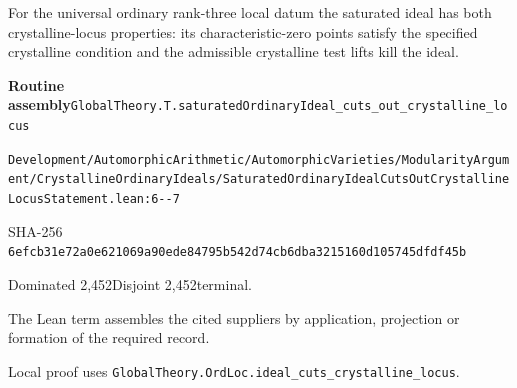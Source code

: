 \begin{formalstatement}[D097]\label{decomp:D097}
For the universal ordinary rank-three local datum the saturated ideal has both crystalline-locus properties: its characteristic-zero points satisfy the specified crystalline condition and the admissible crystalline test lifts kill the ideal.
\end{formalstatement}
{\small\raggedright\noindent\textsf{\bfseries Routine assembly}\quad \nolinkurl{GlobalTheory.T.saturatedOrdinaryIdeal_cuts_out_crystalline_locus}\par\noindent \nolinkurl{Development/AutomorphicArithmetic/AutomorphicVarieties/ModularityArgument/CrystallineOrdinaryIdeals/SaturatedOrdinaryIdealCutsOutCrystallineLocusStatement.lean:6--7}\par\noindent SHA-256 \nolinkurl{6efcb31e72a0e621069a90ede84795b542d74cb6dba3215160d105745dfdf45b}\par\noindent Dominated 2,452\quad Disjoint 2,452\quad terminal.\par}
The Lean term assembles the cited suppliers by application, projection or formation of the required record.
{\small\raggedright Local proof uses \nolinkurl{GlobalTheory.OrdLoc.ideal_cuts_crystalline_locus}.\par}
